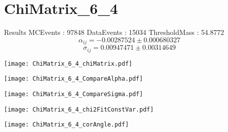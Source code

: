 \documentclass[a4paper,12pt]{article}
\begin{document}
\section{ChiMatrix\_6\_4}
\begin{minipage}{0.49\linewidth} Results \newline
MCEvents : 97848\newline
DataEvents : 15034 \newline
ThresholdMass : 54.8772\\
$$\alpha_{ij} = -0.00287524\pm 0.000680327$$
$$\sigma_{ij} = 0.00947471\pm 0.00314649$$
\end{minipage}\hfill
\begin{minipage}{0.49\linewidth} 
\texttt{[image: ChiMatrix\_6\_4\_chiMatrix.pdf]}\\
\end{minipage}
\hfill
\begin{minipage}{0.49\linewidth} 
\texttt{[image: ChiMatrix\_6\_4\_CompareAlpha.pdf]}\\
\end{minipage}
\hfill
\begin{minipage}{0.49\linewidth} 
\texttt{[image: ChiMatrix\_6\_4\_CompareSigma.pdf]}\\
\end{minipage}
\begin{minipage}{0.49\linewidth} 
\texttt{[image: ChiMatrix\_6\_4\_chi2FitConstVar.pdf]}\\
\end{minipage}
\hfill
\begin{minipage}{0.49\linewidth} 
\texttt{[image: ChiMatrix\_6\_4\_corAngle.pdf]}\\
\end{minipage}
\end{document}
